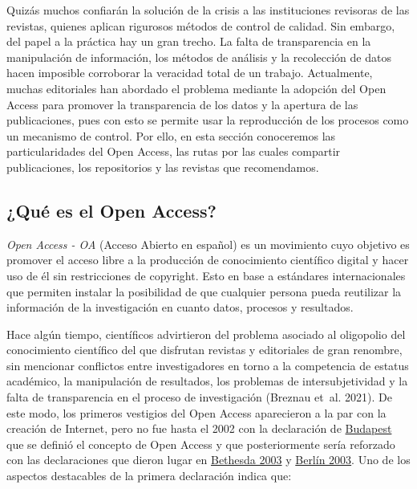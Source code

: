 \documentclass[
  spanish,
  letterpaper,
  DIV=11,
  numbers=noendperiod]{scrreprt}
\begin{document}
Quizás muchos confiarán la solución de la crisis a las instituciones
revisoras de las revistas, quienes aplican rigurosos métodos de control
de calidad. Sin embargo, del papel a la práctica hay un gran trecho. La
falta de transparencia en la manipulación de información, los métodos de
análisis y la recolección de datos hacen imposible corroborar la
veracidad total de un trabajo. Actualmente, muchas editoriales han
abordado el problema mediante la adopción del Open Access para promover
la transparencia de los datos y la apertura de las publicaciones, pues
con esto se permite usar la reproducción de los procesos como un
mecanismo de control. Por ello, en esta sección conoceremos las
particularidades del Open Access, las rutas por las cuales compartir
publicaciones, los repositorios y las revistas que recomendamos.

\subsection{¿Qué es el Open Access?}\label{quuxe9-es-el-open-access}

\emph{Open Access - OA} (Acceso Abierto en español) es un movimiento
cuyo objetivo es promover el acceso libre a la producción de
conocimiento científico digital y hacer uso de él sin restricciones de
copyright. Esto en base a estándares internacionales que permiten
instalar la posibilidad de que cualquier persona pueda reutilizar la
información de la investigación en cuanto datos, procesos y resultados.

Hace algún tiempo, científicos advirtieron del problema asociado al
oligopolio del conocimiento científico del que disfrutan revistas y
editoriales de gran renombre, sin mencionar conflictos entre
investigadores en torno a la competencia de estatus académico, la
manipulación de resultados, los problemas de intersubjetividad y la
falta de transparencia en el proceso de investigación (Breznau et~al.
2021). De este modo, los primeros vestigios del Open Access aparecieron
a la par con la creación de Internet, pero no fue hasta el 2002 con la
declaración de
\href{https://www.budapestopenaccessinitiative.org/translations/spanish-translation/}{Budapest}
que se definió el concepto de Open Access y que posteriormente sería
reforzado con las declaraciones que dieron lugar en
\href{https://ictlogy.net/articles/bethesda_es.html}{Bethesda 2003} y
\href{https://openaccess.mpg.de/67627/Berlin_sp.pdf}{Berlín 2003}. Uno
de los aspectos destacables de la primera declaración indica que:
\end{document}
